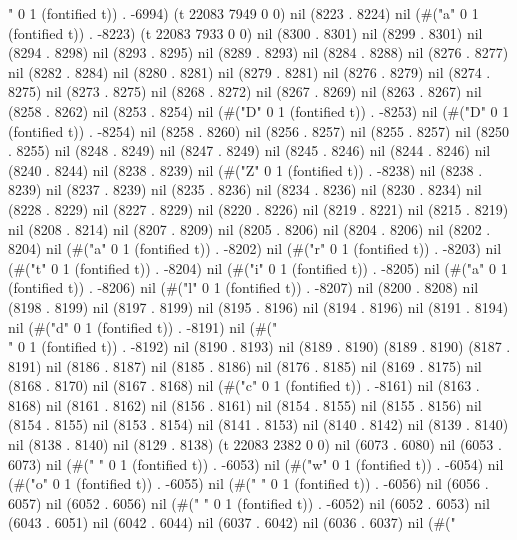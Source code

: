 " 0 1 (fontified t)) . -6994) (t 22083 7949 0 0) nil (8223 . 8224) nil (#("a" 0 1 (fontified t)) . -8223) (t 22083 7933 0 0) nil (8300 . 8301) nil (8299 . 8301) nil (8294 . 8298) nil (8293 . 8295) nil (8289 . 8293) nil (8284 . 8288) nil (8276 . 8277) nil (8282 . 8284) nil (8280 . 8281) nil (8279 . 8281) nil (8276 . 8279) nil (8274 . 8275) nil (8273 . 8275) nil (8268 . 8272) nil (8267 . 8269) nil (8263 . 8267) nil (8258 . 8262) nil (8253 . 8254) nil (#("D" 0 1 (fontified t)) . -8253) nil (#("D" 0 1 (fontified t)) . -8254) nil (8258 . 8260) nil (8256 . 8257) nil (8255 . 8257) nil (8250 . 8255) nil (8248 . 8249) nil (8247 . 8249) nil (8245 . 8246) nil (8244 . 8246) nil (8240 . 8244) nil (8238 . 8239) nil (#("Z" 0 1 (fontified t)) . -8238) nil (8238 . 8239) nil (8237 . 8239) nil (8235 . 8236) nil (8234 . 8236) nil (8230 . 8234) nil (8228 . 8229) nil (8227 . 8229) nil (8220 . 8226) nil (8219 . 8221) nil (8215 . 8219) nil (8208 . 8214) nil (8207 . 8209) nil (8205 . 8206) nil (8204 . 8206) nil (8202 . 8204) nil (#("a" 0 1 (fontified t)) . -8202) nil (#("r" 0 1 (fontified t)) . -8203) nil (#("t" 0 1 (fontified t)) . -8204) nil (#("i" 0 1 (fontified t)) . -8205) nil (#("a" 0 1 (fontified t)) . -8206) nil (#("l" 0 1 (fontified t)) . -8207) nil (8200 . 8208) nil (8198 . 8199) nil (8197 . 8199) nil (8195 . 8196) nil (8194 . 8196) nil (8191 . 8194) nil (#("d" 0 1 (fontified t)) . -8191) nil (#("\\" 0 1 (fontified t)) . -8192) nil (8190 . 8193) nil (8189 . 8190) (8189 . 8190) (8187 . 8191) nil (8186 . 8187) nil (8185 . 8186) nil (8176 . 8185) nil (8169 . 8175) nil (8168 . 8170) nil (8167 . 8168) nil (#("c" 0 1 (fontified t)) . -8161) nil (8163 . 8168) nil (8161 . 8162) nil (8156 . 8161) nil (8154 . 8155) nil (8155 . 8156) nil (8154 . 8155) nil (8153 . 8154) nil (8141 . 8153) nil (8140 . 8142) nil (8139 . 8140) nil (8138 . 8140) nil (8129 . 8138) (t 22083 2382 0 0) nil (6073 . 6080) nil (6053 . 6073) nil (#(" " 0 1 (fontified t)) . -6053) nil (#("w" 0 1 (fontified t)) . -6054) nil (#("o" 0 1 (fontified t)) . -6055) nil (#("
" 0 1 (fontified t)) . -6056) nil (6056 . 6057) nil (6052 . 6056) nil (#(" " 0 1 (fontified t)) . -6052) nil (6052 . 6053) nil (6043 . 6051) nil (6042 . 6044) nil (6037 . 6042) nil (6036 . 6037) nil (#("
